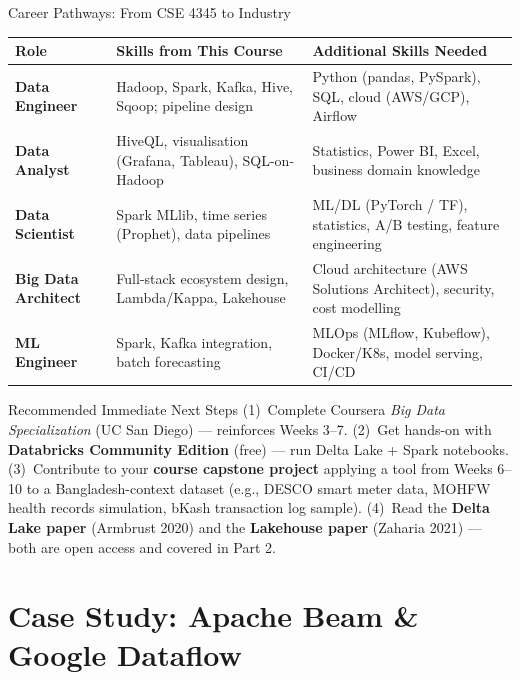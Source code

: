 \documentclass[aspectratio=169,10pt]{beamer}
\begin{document}
\begin{frame}{Career Pathways: From CSE 4345 to Industry}
  \begin{center}
  \renewcommand{\arraystretch}{1.45}
  \begin{tabular}{p{2.4cm} p{4.4cm} p{4.4cm}}
    \toprule
    \textbf{Role} & \textbf{Skills from This Course} & \textbf{Additional Skills Needed} \\
    \midrule
    \textbf{Data Engineer}       & Hadoop, Spark, Kafka, Hive, Sqoop; pipeline design & Python (pandas, PySpark), SQL, cloud (AWS/GCP), Airflow \\
    \textbf{Data Analyst}        & HiveQL, visualisation (Grafana, Tableau), SQL-on-Hadoop & Statistics, Power BI, Excel, business domain knowledge \\
    \textbf{Data Scientist}      & Spark MLlib, time series (Prophet), data pipelines & ML/DL (PyTorch / TF), statistics, A/B testing, feature engineering \\
    \textbf{Big Data Architect}  & Full-stack ecosystem design, Lambda/Kappa, Lakehouse & Cloud architecture (AWS Solutions Architect), security, cost modelling \\
    \textbf{ML Engineer}         & Spark, Kafka integration, batch forecasting & MLOps (MLflow, Kubeflow), Docker/K8s, model serving, CI/CD \\
    \bottomrule
  \end{tabular}
  \end{center}
  \vspace{4pt}
  \begin{exampleblock}{Recommended Immediate Next Steps}
    \small (1)\ Complete Coursera \textit{Big Data Specialization} (UC San Diego) --- reinforces Weeks 3--7.
    \quad (2)\ Get hands-on with \textbf{Databricks Community Edition} (free) --- run Delta Lake + Spark notebooks.
    \quad (3)\ Contribute to your \textbf{course capstone project} applying a tool from Weeks 6--10 to a Bangladesh-context dataset (e.g., DESCO smart meter data, MOHFW health records simulation, bKash transaction log sample).
    \quad (4)\ Read the \textbf{Delta Lake paper} (Armbrust 2020) and the \textbf{Lakehouse paper} (Zaharia 2021) --- both are open access and covered in Part 2.
  \end{exampleblock}
\end{frame}

\section{Case Study: Apache Beam \& Google Dataflow}
\end{document}
